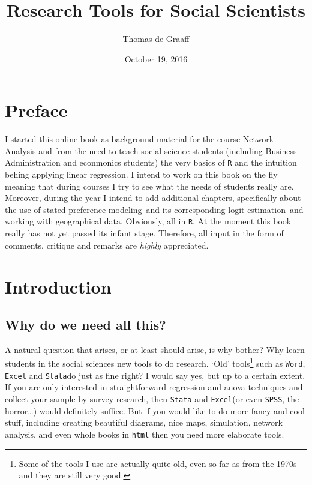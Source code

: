 \documentclass[]{article}
\title{Research Tools for Social Scientists}
\author{Thomas de Graaff}
\date{October 19, 2016}
\let\rmarkdownfootnote\footnote%
\def\footnote{\protect\rmarkdownfootnote}
\begin{document}
\maketitle

{
\setcounter{tocdepth}{2}
\tableofcontents
}
\section{Preface}\label{preface}

I started this online book as background material for the course Network
Analysis and from the need to teach social science students (including
Business Administration and econmonics students) the very basics of
\texttt{R} and the intuition behing applying linear regression. I intend
to work on this book on the fly meaning that during courses I try to see
what the needs of students really are. Moreover, during the year I
intend to add additional chapters, specifically about the use of stated
preference modeling--and its corresponding logit estimation--and working
with geographical data. Obviously, all in \texttt{R}. At the moment this
book really has not yet passed its infant stage. Therefore, all input in
the form of comments, critique and remarks are \emph{highly}
appreciated.

\section{Introduction}\label{introduction}

\subsection{Why do we need all this?}\label{why-do-we-need-all-this}

A natural question that arises, or at least should arise, is why bother?
Why learn students in the social sciences new tools to do research.
`Old' tools\footnote{Some of the tools I use are actually quite old,
  even so far as from the 1970s and they are still very good.} such as
\texttt{Word}, \texttt{Excel} and \texttt{Stata}do just as fine right? I
would say yes, but up to a certain extent. If you are only interested in
straightforward regression and anova techniques and collect your sample
by survey research, then \texttt{Stata} and \texttt{Excel}(or even
\texttt{SPSS}, the horror\ldots{}) would definitely suffice. But if you
would like to do more fancy and cool stuff, including creating beautiful
diagrams, nice maps, simulation, network analysis, and even whole books
in \texttt{html} then you need more elaborate tools.
\end{document}
